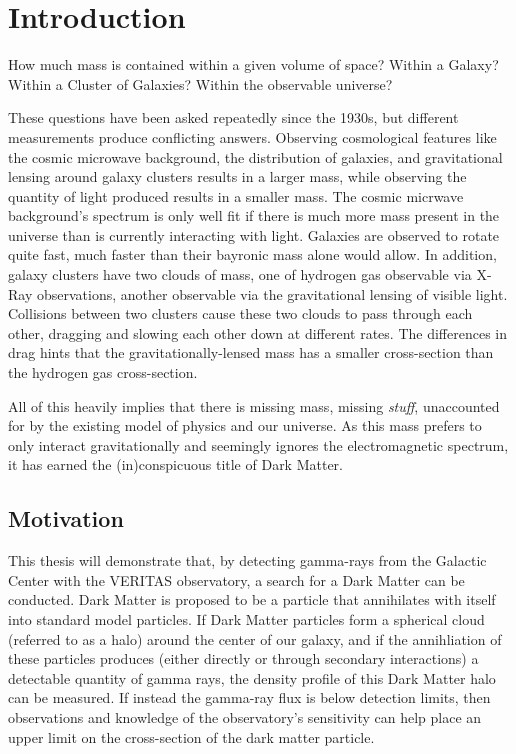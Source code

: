 \cleartooddpage[\thispagestyle{empty}]
\chapter{Introduction}

  How much mass is contained within a given volume of space?
  Within a Galaxy?
  Within a Cluster of Galaxies?
  Within the observable universe?

  These questions have been asked repeatedly since the 1930s, but different measurements produce conflicting answers.
  Observing cosmological features like the cosmic microwave background, the distribution of galaxies, and gravitational lensing around galaxy clusters results in a larger mass, while observing the quantity of light produced results in a smaller mass.
  The cosmic micrwave background's spectrum is only well fit if there is much more mass present in the universe than is currently interacting with light.
  Galaxies are observed to rotate quite fast, much faster than their bayronic mass alone would allow.
  In addition, galaxy clusters have two clouds of mass, one of hydrogen gas observable via X-Ray observations, another observable via the gravitational lensing of visible light.
  Collisions between two clusters cause these two clouds to pass through each other, dragging and slowing each other down at different rates.
  The differences in drag hints that the gravitationally-lensed mass has a smaller cross-section than the hydrogen gas cross-section.
  
  All of this heavily implies that there is missing mass, missing \textit{stuff}, unaccounted for by the existing model of physics and our universe.
  As this mass prefers to only interact gravitationally and seemingly ignores the electromagnetic spectrum, it has earned the (in)conspicuous title of Dark Matter.

\section{Motivation}
  This thesis will demonstrate that, by detecting gamma-rays from the Galactic Center with the VERITAS observatory, a search for a Dark Matter can be conducted.
  Dark Matter is proposed to be a particle that annihilates with itself into standard model particles.
  If Dark Matter particles form a spherical cloud (referred to as a halo) around the center of our galaxy, and if the annihliation of these particles produces (either directly or through secondary interactions) a detectable quantity of gamma rays, the density profile of this Dark Matter halo can be measured.
  If instead the gamma-ray flux is below detection limits, then observations and knowledge of the observatory's sensitivity can help place an upper limit on the cross-section of the dark matter particle.

